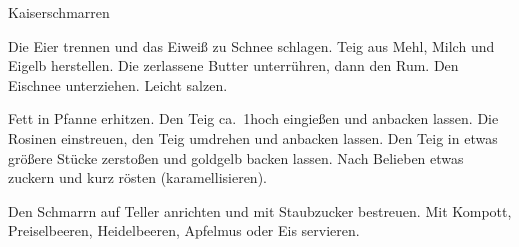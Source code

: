 \begin{recipe}[\vegetarian]{Kaiserschmarren}
%
%
%
%

\begin{ingredients}
\end{ingredients}

\begin{instructions}
    Die Eier trennen und das Eiweiß zu Schnee schlagen.
    Teig aus Mehl, Milch und Eigelb herstellen.
    Die zerlassene Butter unterrühren, dann den Rum.
    Den Eischnee unterziehen.
    Leicht salzen.

    Fett in Pfanne erhitzen.
    Den Teig ca.\ 1\cm hoch eingießen und anbacken lassen.
    Die Rosinen einstreuen, den Teig umdrehen und anbacken lassen.
    Den Teig in etwas größere Stücke zerstoßen und goldgelb backen lassen.
    Nach Belieben etwas zuckern und kurz rösten (karamellisieren).

    Den Schmarrn auf Teller anrichten und mit Staubzucker bestreuen.
    Mit Kompott, Preiselbeeren, Heidelbeeren, Apfelmus oder Eis servieren.
\end{instructions}
\end{recipe}
